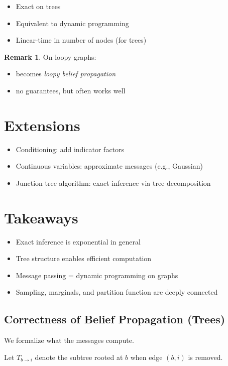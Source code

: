 \documentclass[12pt,oneside]{book}
\numberwithin{equation}{section}
\theoremstyle{definition}
\newtheorem{remark}{Remark}[section]
\theoremstyle{plain}
\theoremstyle{remark}
\begin{document}
\begin{itemize}
\item Exact on trees
\item Equivalent to dynamic programming
\item Linear-time in number of nodes (for trees)
\end{itemize}

\begin{remark}
On loopy graphs:
\begin{itemize}
\item becomes \emph{loopy belief propagation}
\item no guarantees, but often works well
\end{itemize}
\end{remark}


\section{Extensions}

\begin{itemize}
\item Conditioning: add indicator factors
\item Continuous variables: approximate messages (e.g., Gaussian)
\item Junction tree algorithm: exact inference via tree decomposition
\end{itemize}


\section{Takeaways}

\begin{itemize}
\item Exact inference is exponential in general
\item Tree structure enables efficient computation
\item Message passing = dynamic programming on graphs
\item Sampling, marginals, and partition function are deeply connected
\end{itemize}

\subsection*{Correctness of Belief Propagation (Trees)}

We formalize what the messages compute.

Let $T_{b \to i}$ denote the subtree rooted at $b$ when edge $(b,i)$ is removed.
\end{document}
